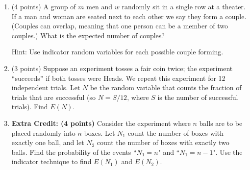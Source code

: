 \documentclass[11pt]{article}
\begin{document}
\begin{enumerate}
\item (4 points) A group of $m$ men and $w$ randomly sit in a single row at a
theater.  If a man and woman are seated next to each other we say they form a
couple.  (Couples can overlap, meaning that one person can be a member of two
couples.)  What is the expected number of couples?
\begin{small}\textsf{Hint: Use indicator
random variables for each possible couple forming.
}\end{small}


\item (3 points) Suppose an experiment tosses a fair coin twice;  the experiment
``succeeds'' if both tosses were Heads.  We repeat this experiment 
for 12 independent trials.  Let $N$ be the random variable that counts
the fraction of trials that are successful (so $N = S/12$, where
$S$ is the number of successful trials).  Find $E(N)$.

\item \textbf{Extra Credit: (4 points)} Consider the experiment where $n$ balls
are to be placed randomly into $n$ boxes. Let $N_1$ count the number of boxes
with exactly one ball, and let $N_2$ count the number of boxes with exactly two
balls. Find the probability of the events ``$N_1 = n$" and ``$N_1 = n - 1$".
Use the indicator technique to find $E(N_1)$ and $E(N_2)$.


\end{enumerate}
\end{document}
